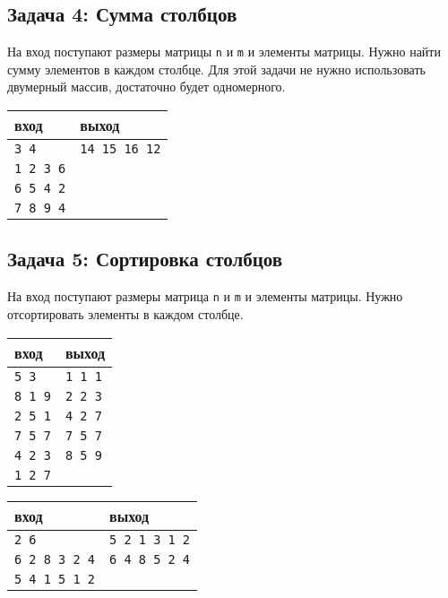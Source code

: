 \documentclass{article}
\begin{document}
\subsection*{Задача 4: Сумма столбцов}
На вход поступают размеры матрицы \texttt{n} и \texttt{m} и элементы матрицы. Нужно найти сумму элементов в каждом столбце. Для этой задачи не нужно использовать двумерный массив, достаточно будет одномерного.
\begin{center}
\begin{tabular}{ l | l }
 вход & выход \\ \hline
 \texttt{3 4} &    \texttt{14 15 16 12}  \\ 
 \texttt{1 2 3 6} &  \\
 \texttt{6 5 4 2} &  \\ 
 \texttt{7 8 9 4} &  \\ 
\end{tabular}
\end{center}



\subsection*{Задача 5: Сортировка столбцов}
На вход поступают размеры матрица \texttt{n} и \texttt{m} и элементы матрицы. Нужно отсортировать элементы в каждом столбце.
\begin{multicols}{2}
\begin{center}
\begin{tabular}{ l | l }
 вход & выход \\ \hline
 \texttt{5 3} &    \texttt{1 1 1} \\ 
 \texttt{8 1 9} &  \texttt{2 2 3}\\
 \texttt{2 5 1} &  \texttt{4 2 7}\\ 
 \texttt{7 5 7} &  \texttt{7 5 7}\\ 
 \texttt{4 2 3} &  \texttt{8 5 9}\\ 
 \texttt{1 2 7} &  \\ 
\end{tabular}
\end{center}

\begin{center}
\begin{tabular}{ l | l }
 вход & выход \\ \hline
 \texttt{2 6} &          \texttt{5 2 1 3 1 2} \\ 
 \texttt{6 2 8 3 2 4} &  \texttt{6 4 8 5 2 4}\\
 \texttt{5 4 1 5 1 2} & \\ 
\end{tabular}
\end{center}
\end{multicols}
\end{document}
